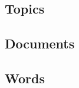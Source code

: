 \documentclass[11pt]{article}
\begin{document}
% 

\subsection{Topics}

\subsection{Documents}

\subsection{Words}
\end{document}
